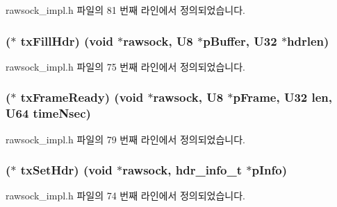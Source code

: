rawsock\+\_\+impl.\+h 파일의 81 번째 라인에서 정의되었습니다.

\subsubsection[{\texorpdfstring{tx\+Fill\+Hdr}{txFillHdr}}]{($\ast$ tx\+Fill\+Hdr) (void $\ast$rawsock, {\bf U8} $\ast$p\+Buffer, {\bf U32} $\ast$hdrlen)}\hypertarget{structrawsock__cb__t_a2e7da852d3fab19f9b408b612b84e1bb}{}\label{structrawsock__cb__t_a2e7da852d3fab19f9b408b612b84e1bb}


rawsock\+\_\+impl.\+h 파일의 75 번째 라인에서 정의되었습니다.

\subsubsection[{\texorpdfstring{tx\+Frame\+Ready}{txFrameReady}}]{($\ast$ tx\+Frame\+Ready) (void $\ast$rawsock, {\bf U8} $\ast$p\+Frame, {\bf U32} len, {\bf U64} time\+Nsec)}\hypertarget{structrawsock__cb__t_ae06401a7fdbf21f6bfd7fd65d8e760d0}{}\label{structrawsock__cb__t_ae06401a7fdbf21f6bfd7fd65d8e760d0}


rawsock\+\_\+impl.\+h 파일의 79 번째 라인에서 정의되었습니다.

\subsubsection[{\texorpdfstring{tx\+Set\+Hdr}{txSetHdr}}]{($\ast$ tx\+Set\+Hdr) (void $\ast$rawsock, {\bf hdr\+\_\+info\+\_\+t} $\ast$p\+Info)}\hypertarget{structrawsock__cb__t_ab875aa95ffb8d23ba35bd17d44e0bbb0}{}\label{structrawsock__cb__t_ab875aa95ffb8d23ba35bd17d44e0bbb0}


rawsock\+\_\+impl.\+h 파일의 74 번째 라인에서 정의되었습니다.

